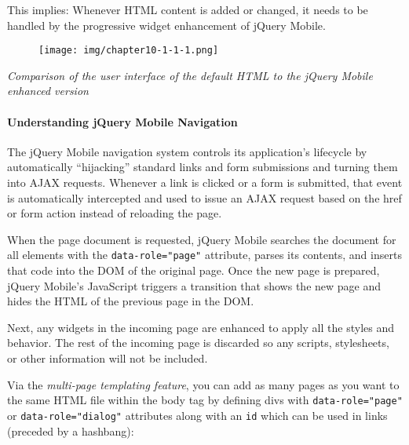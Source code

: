 \documentclass[9pt]{book}
\begin{document}
This implies: Whenever HTML content is added or changed, it needs to be
handled by the progressive widget enhancement of jQuery Mobile.

\begin{figure}[htbp]
\centering
\texttt{[image: img/chapter10-1-1-1.png]}
\end{figure}

\emph{Comparison of the user interface of the default HTML to the jQuery
Mobile enhanced version}

\paragraph{Understanding jQuery Mobile
Navigation}\label{understanding-jquery-mobile-navigation}

The jQuery Mobile navigation system controls its application's lifecycle
by automatically ``hijacking'' standard links and form submissions and
turning them into AJAX requests. Whenever a link is clicked or a form is
submitted, that event is automatically intercepted and used to issue an
AJAX request based on the href or form action instead of reloading the
page.

When the page document is requested, jQuery Mobile searches the document
for all elements with the \texttt{data-role="page"} attribute, parses
its contents, and inserts that code into the DOM of the original page.
Once the new page is prepared, jQuery Mobile's JavaScript triggers a
transition that shows the new page and hides the HTML of the previous
page in the DOM.

Next, any widgets in the incoming page are enhanced to apply all the
styles and behavior. The rest of the incoming page is discarded so any
scripts, stylesheets, or other information will not be included.

Via the \emph{multi-page templating feature}, you can add as many pages
as you want to the same HTML file within the body tag by defining divs
with \texttt{data-role="page"} or \texttt{data-role="dialog"} attributes
along with an \texttt{id} which can be used in links (preceded by a
hashbang):
\end{document}
